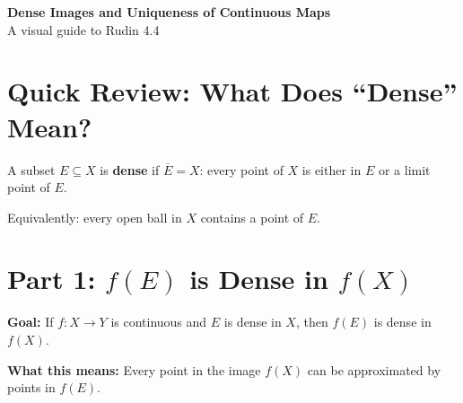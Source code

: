 \documentclass[12pt]{article}
\begin{document}
\begin{center}
    \textbf{\Large Dense Images and Uniqueness of Continuous Maps}\\[0.5em]
    \large A visual guide to Rudin 4.4
\end{center}

\section{Quick Review: What Does ``Dense'' Mean?}

A subset $E \subseteq X$ is \textbf{dense} if $\overline{E} = X$: every point of $X$ is either in $E$ or a limit point of $E$.

Equivalently: every open ball in $X$ contains a point of $E$.

\begin{center}
\end{center}

\section{Part 1: $f(E)$ is Dense in $f(X)$}

\textbf{Goal:} If $f: X \to Y$ is continuous and $E$ is dense in $X$, then $f(E)$ is dense in $f(X)$.

\textbf{What this means:} Every point in the image $f(X)$ can be approximated by points in $f(E)$.
\end{document}
